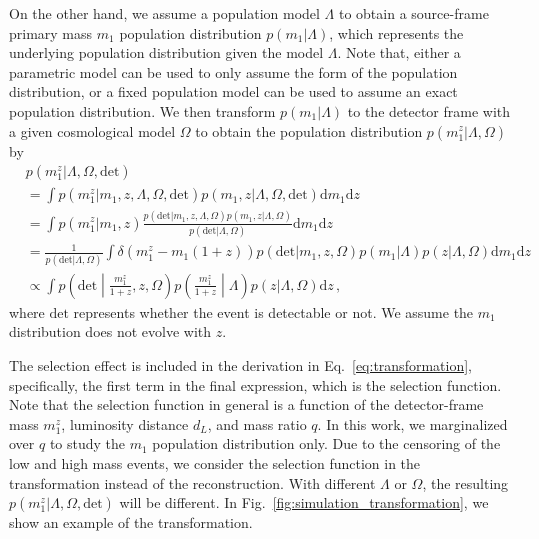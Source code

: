 \documentclass[sn-aps, pdflatex]{sn-jnl}
\begin{document}
On the other hand, we assume a population model $\Lambda$ to obtain a source-frame primary mass $m_1$ population distribution $p(m_1|\Lambda)$, which represents the underlying population distribution given the model $\Lambda$.
Note that, either a parametric model can be used to only assume the form of the population distribution, or a fixed population model can be used to assume an exact population distribution.
We then transform $p(m_1|\Lambda)$ to the detector frame with a given cosmological model $\Omega$ to obtain the population distribution $p(m^z_1|\Lambda, \Omega)$ by
\begin{equation}
    \begin{aligned}
        &p(m^z_1|\Lambda, \Omega, \mathrm{det}) \\
        &= \int p(m^z_1|m_1, z, \Lambda, \Omega, \mathrm{det}) p(m_1, z|\Lambda, \Omega, \mathrm{det}) \mathrm{d}m_1 \mathrm{d}z \\
        &= \int p(m^z_1|m_1, z) \frac{p(\mathrm{det}|m_1, z, \Lambda, \Omega)p(m_1, z|\Lambda, \Omega)}{p(\mathrm{det}|\Lambda, \Omega)} \mathrm{d}m_1 \mathrm{d}z \\
        &= \frac{1}{p(\mathrm{det}|\Lambda, \Omega)}\int \delta(m^z_1-m_1(1+z))p(\mathrm{det}|m_1, z, \Omega)p(m_1|\Lambda)p(z|\Lambda, \Omega) \mathrm{d}m_1 \mathrm{d}z \\
        &\propto \int p\left(\mathrm{det}\middle|\frac{m^z_1}{1+z},z,\Omega\right)p\left(\frac{m^z_1}{1+z}\middle|\Lambda\right)p(z|\Lambda, \Omega) \mathrm{d}z\,,
    \end{aligned}
    \label{eq:transformation}
\end{equation}
where $\mathrm{det}$ represents whether the event is detectable or not.
We assume the $m_1$ distribution does not evolve with $z$.

The selection effect is included in the derivation in Eq.~\eqref{eq:transformation}, specifically, the first term in the final expression, which is the selection function.
Note that the selection function in general is a function of the detector-frame mass $m^z_1$, luminosity distance $d_L$, and mass ratio $q$.
In this work, we marginalized over $q$ to study the $m_1$ population distribution only.
Due to the censoring of the low and high mass events, we consider the selection function in the transformation instead of the reconstruction.
With different $\Lambda$ or $\Omega$, the resulting $p(m^z_1|\Lambda, \Omega, \mathrm{det})$ will be different.
In Fig.~\ref{fig:simulation_transformation}, we show an example of the transformation.
\end{document}

